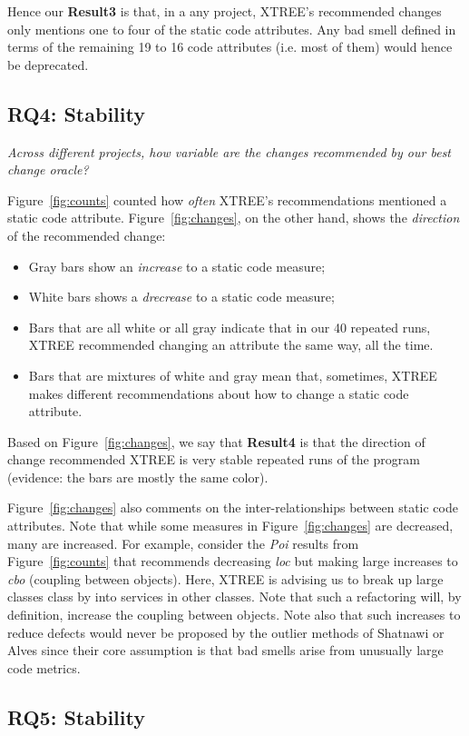 \documentclass[twocolumn,5p]{elsarticle}
\newcommand{\bi}{\begin{itemize}[leftmargin=0.4cm]}
\newcommand{\ei}{\end{itemize}}
\newcommand{\fig}[1]{Figure~\ref{fig:#1}}
\theoremstyle{break}
\begin{document}
\begin{itemize}
Hence our {\bf Result3} is that, in a any  project,  XTREE’s  recommended  changes  only  mentions one to four 
of the  static code attributes.  Any bad smell defined in terms of the remaining 19 to 16 code attributes (i.e. most of them)
would hence be deprecated.


\subsection{RQ4: Stability}

{\em Across different projects, how variable are the changes recommended by our best change oracle? }


\fig{counts} counted how {\em often} XTREE's recommendations mentioned a static code attribute.
\fig{changes}, on the other hand, shows the {\em direction} of the recommended change:
\bi
\item Gray bars show  an  {\em increase} to a static code measure;
\item White bars shows a   {\em drecrease} to a static code measure;
\item Bars that are all white or all gray indicate that in our 40 repeated runs, XTREE recommended changing an attribute the same way, all the time.
\item Bars that are mixtures of white and gray mean that, sometimes, XTREE makes different recommendations about how to change a static
code attribute.
\ei
Based on \fig{changes}, we say that {\bf Result4} is that the direction of change recommended  XTREE is  very stable repeated runs of the program  (evidence:
the bars are mostly the same color).

\fig{changes} also comments on the inter-relationships between static code attributes. Note that while some measures in
\fig{changes} are decreased, many are increased.  
For example, consider the {\em Poi} results
from \fig{counts} that recommends decreasing {\em loc}
but making large increases to {\em cbo} (coupling between
objects). Here, XTREE is advising us to break up
large classes class by into services
in other classes. Note that such a refactoring will, by
definition, increase the coupling between objects. 
Note also that such increases  to reduce
defects would never be proposed by the outlier methods
of Shatnawi or Alves since their core assumption is that bad
smells arise from unusually large code metrics.
 
\subsection{RQ5: Stability}


\end{itemize}
\end{document}
